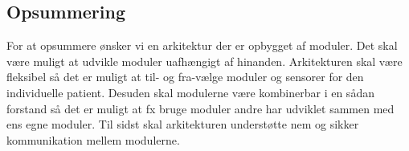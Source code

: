 \subsection{Opsummering}
For at opsummere ønsker vi en arkitektur der er opbygget af moduler.
Det skal være muligt at udvikle moduler uafhængigt af hinanden.
Arkitekturen skal være fleksibel så det er muligt at til- og fra-vælge moduler og sensorer for den individuelle patient.
Desuden skal modulerne være kombinerbar i en sådan forstand så det er muligt at fx bruge moduler andre har udviklet sammen med ens egne moduler.
Til sidst skal arkitekturen understøtte nem og sikker kommunikation mellem modulerne.


